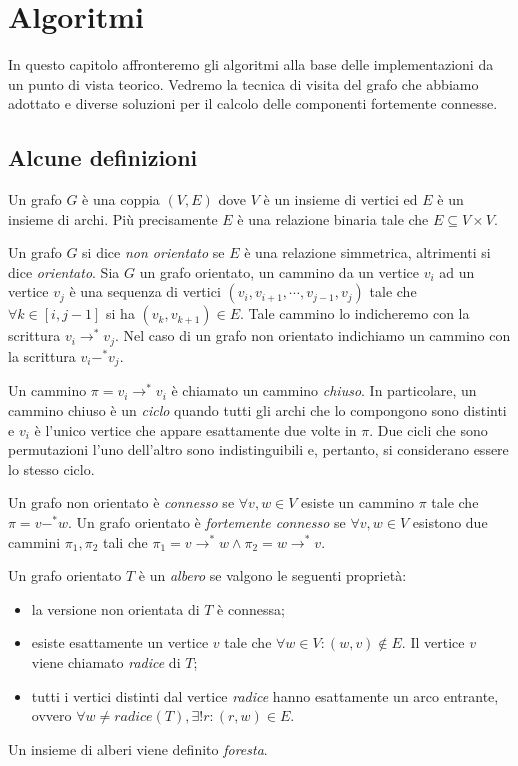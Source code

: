 \chapter{Algoritmi}
\label{chapter:theoretical-background}
In questo capitolo affronteremo gli algoritmi alla base delle
implementazioni da un punto di vista teorico. Vedremo la tecnica di
visita del grafo che abbiamo adottato e diverse soluzioni per il
calcolo delle componenti fortemente connesse.

\section{Alcune definizioni}
\label{subsection:some-definitions}
Un grafo $G$ \`e una coppia $(V, E)$ dove $V$ \`e un insieme di
vertici ed $E$ \`e un insieme di archi. Pi\`u precisamente $E$ \`e una
relazione binaria tale che $E \subseteq V \times V$.

Un grafo $G$ si dice \emph{non orientato} se $E$ \`e una relazione
simmetrica, altrimenti si dice \emph{orientato}. Sia $G$ un grafo
orientato, un cammino da un vertice $v_{i}$ ad un vertice $v_{j}$ \`e
una sequenza di vertici $(v_{i}, v_{i+1}, \cdots, v_{j-1}, v_{j})$
tale che $\forall k \in [i, j-1]$ si ha $(v_{k},v_{k+1}) \in E$. Tale
cammino lo indicheremo con la scrittura $v_{i} \rightarrow^{*}
v_{j}$. Nel caso di un grafo non orientato indichiamo un cammino con
la scrittura $v_{i} -^{*} v_{j}$.

Un cammino $\pi = v_{i} \rightarrow^{*} v_{i}$ \`e chiamato un cammino
\emph{chiuso}. In particolare, un cammino chiuso \`e un \emph{ciclo}
quando tutti gli archi che lo compongono sono distinti e $v_{i}$ \`e
l'unico vertice che appare esattamente due volte in $\pi$. Due cicli
che sono permutazioni l'uno dell'altro sono indistinguibili e,
pertanto, si considerano essere lo stesso ciclo.

Un grafo non orientato \`e \emph{connesso} se $\forall v, w \in V$
esiste un cammino $\pi$ tale che $\pi = v -^{*} w$. Un grafo orientato
\`e \emph{fortemente connesso} se $\forall v, w \in V$ esistono due
cammini $\pi_{1}, \pi_{2}$ tali che $\pi_{1} = v \rightarrow^{*} w
\wedge \pi_{2} = w \rightarrow^{*} v$.

Un grafo orientato $T$ \`e un \emph{albero} se valgono le seguenti
propriet\`a:
\begin{itemize}
\item la versione non orientata di $T$ \`e connessa;
\item esiste esattamente un vertice $v$ tale che $\forall w \in V: (w,
  v) \not \in E$. Il vertice $v$ viene chiamato \emph{radice} di $T$;
\item tutti i vertici distinti dal vertice \emph{radice} hanno
  esattamente un arco entrante, ovvero $\forall w \not = radice(T),
  \exists!r: (r, w) \in E$.
\end{itemize}
Un insieme di alberi viene definito \emph{foresta}.  

